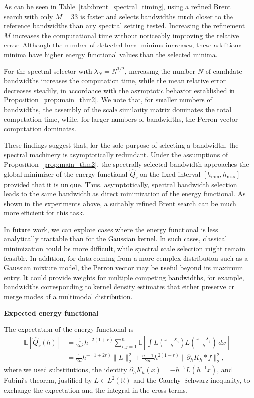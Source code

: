 As can be seen in Table~\ref{tab:brent_spectral_timing}, using a refined Brent search with only $M=33$ is faster and selects bandwidths much closer to the reference bandwidths than any spectral setting tested. Increasing the refinement $M$ increases the computational time without noticeably improving the relative error. Although the number of detected local minima increases, these additional minima have higher energy functional values than the selected minima.

For the spectral selector with $\lambda_N=N^{3/2}$, increasing the number $N$ of candidate bandwidths increases the computation time, while the mean relative error decreases steadily, in accordance with the asymptotic behavior established in Proposition~\ref{prop:main_thm2}. We note that, for smaller numbers of bandwidths, the assembly of the scale similarity matrix dominates the total computation time, while, for larger numbers of bandwidths, the Perron vector computation dominates.

These findings suggest that, for the sole purpose of selecting a bandwidth, the spectral machinery is asymptotically redundant. Under the assumptions of Proposition~\ref{prop:main_thm2}, the spectrally selected bandwidth approaches the global minimizer of the energy functional $\hat{Q}_r$ on the fixed interval $[h_{\min},h_{\max}]$ provided that it is unique. Thus, asymptotically, spectral bandwidth selection leads to the same bandwidth as direct minimization of the energy functional. As shown in the experiments above, a suitably refined Brent search can be much more efficient for this task.

In future work, we can explore cases where the energy functional is less analytically tractable than for the Gaussian kernel. In such cases, classical minimization could be more difficult, while spectral scale selection might remain feasible. In addition, for data coming from a more complex distribution such as a Gaussian mixture model, the Perron vector may be useful beyond its maximum entry. It could provide weights for multiple competing bandwidths, for example, bandwidths corresponding to kernel density estimates that either preserve or merge modes of a multimodal distribution.

\textbf{Expected energy functional}


The expectation of the energy functional is
\begin{align*}
    \mathbb{E}[\hat{Q}_r(h)]&=\frac{1}{2n^2}h^{-2(1+r)}\sum_{i,j=1}^{n}\mathbb{E}\left[\int L\left(\frac{x-X_i}{h}\right)L\left(\frac{x-X_j}{h}\right)\,dx\right]\\&
    =\frac{1}{2n}h^{-(1+2r)}\|L\|_2^2+\frac{n-1}{2n}h^{2(1-r)}\|\partial_hK_h\ast f\|_2^2,
\end{align*}
where we used substitutions, the identity $\partial_hK_h(x)=-h^{-2}L(h^{-1}x)$, and Fubini's theorem, justified by $L\in L^2(\mathbb{R})$ and the Cauchy--Schwarz inequality, to exchange the expectation and the integral in the cross terms.

